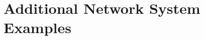 \newpage

\section{Additional Network System Examples}
\label{appendix:MoreNsExamples}


%
%
%





